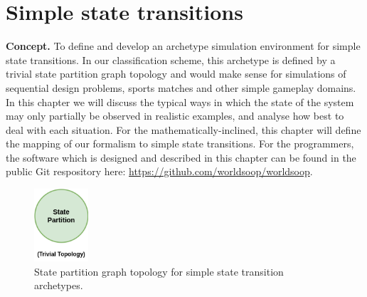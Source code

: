 \chapter{\sffamily Simple state transitions}

{\bfseries\sffamily Concept.} To define and develop an archetype simulation environment for simple state transitions. In our classification scheme, this archetype is defined by a trivial state partition graph topology and would make sense for simulations of sequential design problems, sports matches and other simple gameplay domains. In this chapter we will discuss the typical ways in which the state of the system may only partially be observed in realistic examples, and analyse how best to deal with each situation. For the mathematically-inclined, this chapter will define the mapping of our formalism to simple state transitions. For the programmers, the software which is designed and described in this chapter can be found in the public Git respository here: \href{https://github.com/worldsoop/worldsoop}{https://github.com/worldsoop/worldsoop}.


\begin{figure}[h]
\centering
\includegraphics[width=2cm]{images/chapter-6-state-partition-graph.drawio.png}
\caption{State partition graph topology for simple state transition archetypes.}
\label{fig:state-partition-graph-simple-state-transitions}
\end{figure}

